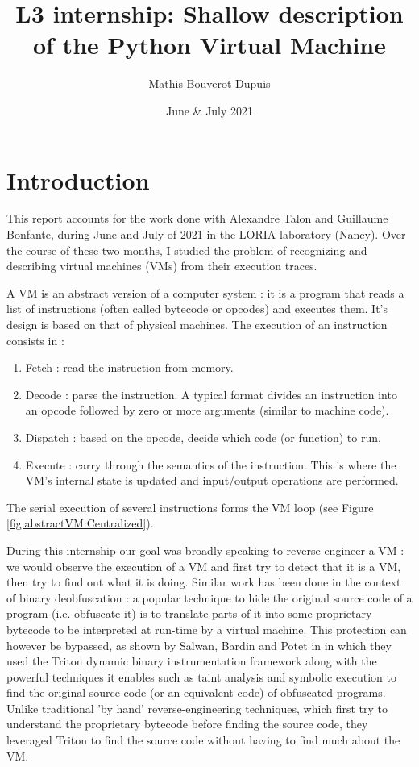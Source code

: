 \documentclass[english]{article}
\begin{document}
	
\title{L3 internship: Shallow description of the Python Virtual Machine}
\author{Mathis Bouverot-Dupuis}
\date{June \& July 2021}

\maketitle 

\tableofcontents
\newpage

\section{Introduction}
This report accounts for the work done with Alexandre Talon and Guillaume Bonfante, during June and July of 2021 in the LORIA laboratory (Nancy). Over the course of these two months, I studied the problem of recognizing and describing virtual machines (VMs) from their execution traces.

A VM is an abstract version of a computer system : it is a program that reads a list of instructions (often called bytecode or opcodes) and executes them. It's design is based on that of physical machines. The execution of an instruction consists in :
\begin{enumerate}
	\item Fetch : read the instruction from memory.
	\item Decode : parse the instruction. A typical format divides an instruction into an opcode followed by zero or more arguments (similar to machine code).
	\item Dispatch : based on the opcode, decide which code (or function) to run.
	\item Execute : carry through the semantics of the instruction. This is where the VM's internal state is updated and input/output operations are performed.
\end{enumerate}
The serial execution of several instructions forms the VM loop (see Figure \ref{fig:abstractVM:Centralized}).

During this internship our goal was broadly speaking to reverse engineer a VM : we would observe the execution of a VM and first try to detect that it is a VM, then try to find out what it is doing. Similar work has been done in the context of binary deobfuscation : a popular technique to hide the original source code of a program (i.e. obfuscate it) is to translate parts of it into some proprietary bytecode to be interpreted at run-time by a virtual machine. This protection can however be bypassed, as shown by Salwan, Bardin and Potet in \cite{tritondeobfs} in which they used the Triton dynamic binary instrumentation framework along with the powerful techniques it enables such as taint analysis and symbolic execution to find the original source code (or an equivalent code) of obfuscated programs. Unlike traditional 'by hand' reverse-engineering techniques, which first try to understand the proprietary bytecode before finding the source code, they leveraged Triton to find the source code without having to find much about the VM. 
\end{document}

